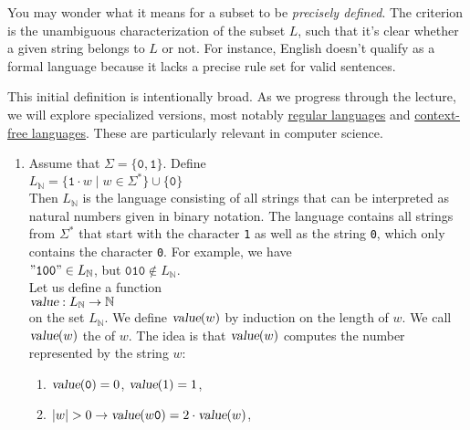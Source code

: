 You may wonder what it means for a subset to be \emph{precisely defined}. The criterion is the unambiguous characterization of the subset \( L \), such that it's clear whether a given string belongs to \( L \) or not. For instance, English doesn't qualify as a formal language because it lacks a precise rule set for valid sentences.

This initial definition is intentionally broad. As we progress through the lecture, we will explore specialized versions, most notably \href{http://en.wikipedia.org/wiki/Regular_language}{regular languages}  and \href{http://en.wikipedia.org/wiki/Context-free_language}{context-free languages}.  These are particularly relevant in computer science.

\examplesEng
\begin{enumerate}
\item Assume that $\Sigma = \{\mathtt{0},\mathtt{1}\}$.  Define
      \\[0.2cm]
      \hspace*{1.3cm}
      $L_\mathbb{N} = \{ \mathtt{1} \cdot w \mid w \in \Sigma^* \} \cup \{ \mathtt{0} \}$
      \\[0.2cm]
      Then $L_\mathbb{N}$ is the language consisting of all strings that can be interpreted as
      natural numbers given in binary notation.  The language contains all strings from $\Sigma^*$  that start with 
      the character \texttt{1} as well as the string \texttt{0}, which only contains the character
      \texttt{0}.  For example, we have
      \\[0.2cm]
      \hspace*{1.3cm}
      $\mathtt{\symbol{34}100\symbol{34}} \in L_\mathbb{N}$, \quad but \quad $\mathtt{010} \not\in L_\mathbb{N}$.
      \\[0.2cm]
      Let us define a function 
      \\[0.2cm]
      \hspace*{1.3cm}
      $\textsl{value}: L_\mathbb{N} \rightarrow \mathbb{N}$
      \\[0.2cm]
      on the set $L_\mathbb{N}$.  We define $\textsl{value}(w)$ by induction on the length of $w$.
      We call $\textsl{value}(w)$ the  of $w$.  The idea is that
      $\textsl{value}(w)$ computes the number represented by the string $w$:
      \begin{enumerate}
      \item $\textsl{value}(\mathtt{0}) = 0$, $\textsl{value}(1) = 1$,
      \item $|w| > 0 \rightarrow \textsl{value}(w\mathtt{0}) = 2 \cdot \textsl{value}(w)   $,

\end{enumerate}
\end{enumerate}
